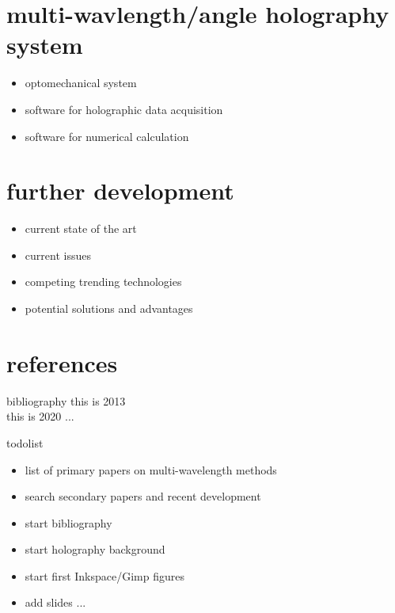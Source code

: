 \documentclass[t, aspectratio=169]{beamer}
\begin{document}
\section{multi-wavlength/angle holography system}

\begin{frame}{\secname}
	\begin{itemize}
		\item optomechanical system
		\item software for holographic data acquisition
		\item software for numerical calculation
	\end{itemize}
\end{frame}


\section{further development}

\begin{frame}{\secname}
	\begin{itemize}
		\item current state of the art
		\item current issues
		\item competing trending technologies
		\item potential solutions and advantages
	\end{itemize}
	\vspace{1 cm}
\end{frame}


\section{references}

\begin{frame}{bibliography}
this is 2013 \cite{Kim2013} \\

this is 2020 ... 


%
%

\end{frame}


\frame{}



\begin{frame}{todolist}
	\begin{itemize}
		\item list of primary papers on multi-wavelength methods
		\item search secondary papers and recent development
		\item start bibliography
		\item start holography background
		\item start first Inkspace/Gimp figures
		\item add slides ...
	\end{itemize}
\end{frame}
\end{document}
